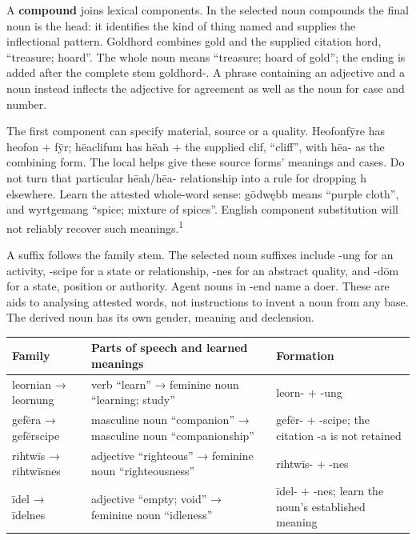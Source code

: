 A \textbf{compound} joins lexical components. In the selected noun compounds the final noun is the head: it identifies the kind of thing named and supplies the inflectional pattern. Goldhord combines gold and the supplied citation hord, “treasure; hoard”. The whole noun means “treasure; hoard of gold”; the ending is added after the complete stem goldhord-. A phrase containing an adjective and a noun instead inflects the adjective for agreement as well as the noun for case and number.

The first component can specify material, source or a quality. Heofonfȳre has heofon + fȳr; hēaclifum has hēah + the supplied clif, “cliff”, with hēa- as the combining form. The local helps give these source forms’ meanings and cases. Do not turn that particular hēah/\allowbreak{}hēa- relationship into a rule for dropping h elsewhere. Learn the attested whole-word sense: gōdwębb means “purple cloth”, and wyrtgemang “spice; mixture of spices”. English component substitution will not reliably recover such meanings.\textsuperscript{1}

A suffix follows the family stem. The selected noun suffixes include -ung for an activity, -scipe for a state or relationship, -nes for an abstract quality, and -dōm for a state, position or authority. Agent nouns in -end name a doer. These are aids to analysing attested words, not instructions to invent a noun from any base. The derived noun has its own gender, meaning and declension.

\par\begingroup
\fontsize{10.5}{13.2}\selectfont
\setlength{\LTleft}{0pt}\setlength{\LTright}{\fill}
\noindent
\begin{tabular}{@{}>{\raggedright\arraybackslash}p{22.05mm}>{\raggedright\arraybackslash}p{52.92mm}>{\raggedright\arraybackslash}p{43.41mm}@{}}
\toprule
\textbf{Family} & \textbf{Parts of speech and learned meanings} & \textbf{Formation} \\
\midrule
leornian → leornung & verb “learn” → feminine noun “learning; study” & leorn- + -ung \\
gefēra → gefērscipe & masculine noun “companion” → masculine noun “companionship” & gefēr- + -scipe; the citation -a is not retained \\
rihtwīs → rihtwīsnes & adjective “righteous” → feminine noun “righteousness” & rihtwīs- + -nes \\
īdel → īdelnes & adjective “empty; void” → feminine noun “idleness” & īdel- + -nes; learn the noun’s established meaning \\
\bottomrule
\end{tabular}
\par\endgroup

